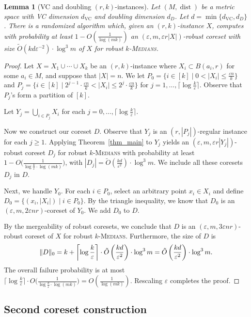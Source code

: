 \documentclass[11pt,letterpaper]{article}
\newtheorem{lemma}[theorem]{Lemma}
\theoremstyle{definition}
\newcommand{\eps}{\varepsilon}
\newcommand{\ProblemName}[1]{\textsc{#1}}
\newcommand{\kMedian}{\ProblemName{$k$-Medians}\xspace}
\DeclareMathOperator{\dist}{dist}
\DeclarePairedDelimiter{\norm}{\lVert}{\rVert}
\begin{document}
\begin{lemma}[VC and doubling $(r,k)$-instances] 
\label{lemma_mainring}
Let $(M,\dist)$ be a metric space with VC dimension $d_{\mathrm{VC}}$ and doubling dimension $d_D$.
%
Let $d = \min\{d_{\mathrm{VC}}, d_D\}$.
%
There is a randomized algorithm which, given an $(r,k)$-instance $X$, computes with probability at least $1- O(\frac{1}{\log (mk)})
	$  an $(\eps,m,\eps r |X|)$-robust coreset with size $\tilde{O}(kd\eps^{-2})\cdot \log^3 m$ of $X$ for robust \kMedian.
\end{lemma}
\begin{proof}
	Let $X=X_1\cup\cdots\cup X_k$ be an $(r,k)$-instance where $X_i\subset B(a_i,r)$ for some $a_i\in M$, and suppose that $|X|=n$. We let $P_0=\{i\in [k] \mid 0 < |X_i|\leq \frac{\eps n}{k}\}$ and $P_j=\{i\in [k]\mid 2^{j-1}\cdot \frac{\eps n}{k}<|X_i|\leq 2^j\cdot \frac{\eps n}{k}\}$ for $j=1,\dots,\lceil\log \frac{k}{\eps}\rceil$. Observe that $P_j$'s form a partition of $[k]$.
	
	Let $Y_j=\bigcup_{i\in P_j} X_i$ for each $j=0,\dots,\lceil\log \frac{k}{\eps}\rceil$.
	
	Now we construct our coreset $D$. Observe that $Y_j$ is an $(r,|P_j|)$-regular instance for each $j\geq 1$. Applying Theorem~\ref{thm_main} to $Y_j$ yields an $(\eps,m,\eps r |Y_j|)$-robust coreset $D_j$ for robust \kMedian with probability at least $1-O\big(\frac{1}{\log \frac{k}{\eps}\cdot \log (mk)}\big)$, with $|D_j| = \tilde{O}(\frac{kd}{\eps^2})\cdot \log^3 m$. We include all these coresets $D_j$ in $D$.
	
	Next, we handle $Y_0$. For each $i\in P_0$, select an arbitrary point $x_i\in X_i$ and define $D_0=\{(x_i,|X_i|)\mid i\in P_0 \}$. By the triangle inequality, we know that $D_0$ is an $(\eps,m,2\eps n r)$-coreset of $Y_0$. We add $D_0$ to $D$. 
	
	By the mergeability of robust coresets, we conclude that $D$ is an $(\eps, m, 3\eps n r)$-robust coreset of $X$ for robust \kMedian. Furthermore, the size of $D$ is
	$$
	\norm{D}_0 = k+ \left\lceil\log \frac{k}{\eps}\right\rceil\cdot \tilde{O}\left(\frac{kd}{\eps^{2}}\right)\cdot \log^3 m=\tilde{O}\left(\frac{kd}{\eps^{2}}\right)\cdot \log^3 m.
	$$
	The overall failure probability is at most $\lceil\log\frac{k}{\eps}\rceil\cdot O\big(\frac{1}{\log \frac{k}{\eps}\cdot \log (mk)}\big) = O(\frac{1}{\log (mk)})$. Rescaling $\eps$ completes the proof.
\end{proof}

\subsection{Second coreset construction}
\label{sec_innergroup}
\end{document}
